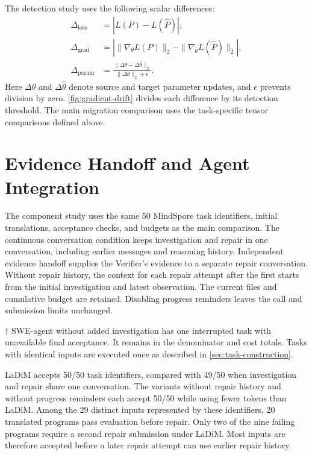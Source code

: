 The detection study uses the following scalar differences:
\begin{align}
\Delta_{\mathrm{loss}} &= |L(P)-L(\hat P)|, \\
\Delta_{\mathrm{grad}} &= \left|\|\nabla_{\theta}L(P)\|_2-\|\nabla_{\hat\theta}L(\hat P)\|_2\right|, \\
\Delta_{\mathrm{param}} &= \frac{\|\Delta\theta-\Delta\hat\theta\|_2}{\|\Delta\theta\|_2+\epsilon}.
\end{align}
Here $\Delta\theta$ and $\Delta\hat\theta$ denote source and target parameter updates, and $\epsilon$ prevents division by zero. \cref{fig:gradient-drift} divides each difference by its detection threshold. The main migration comparison uses the task-specific tensor comparisons defined above.

\section{Evidence Handoff and Agent Integration}
\label{sec:component-study}
The component study uses the same 50 MindSpore task identifiers, initial translations, acceptance checks, and budgets as the main comparison. The continuous conversation condition keeps investigation and repair in one conversation, including earlier messages and reasoning history. Independent evidence handoff supplies the Verifier's evidence to a separate repair conversation. Without repair history, the context for each repair attempt after the first starts from the initial investigation and latest observation. The current files and cumulative budget are retained. Disabling progress reminders leaves the call and submission limits unchanged.
\begin{table}[!htb]
\caption{Component variants and added investigation for baseline agents on the 50 MindSpore task identifiers. Tokens are in millions and include initial translation and all subsequent calls.}
\label{tab:components}
\centering
\small
\setlength{\tabcolsep}{4pt}

\par\vspace{3pt}
\begin{minipage}{\linewidth}
$\dagger$ SWE-agent without added investigation has one interrupted task with unavailable final acceptance. It remains in the denominator and cost totals. Tasks with identical inputs are executed once as described in \cref{sec:task-construction}.
\end{minipage}
\end{table}
LaDiM accepts 50/50 task identifiers, compared with 49/50 when investigation and repair share one conversation. The variants without repair history and without progress reminders each accept 50/50 while using fewer tokens than LaDiM. Among the 29 distinct inputs represented by these identifiers, 20 translated programs pass evaluation before repair. Only two of the nine failing programs require a second repair submission under LaDiM. Most inputs are therefore accepted before a later repair attempt can use earlier repair history.

